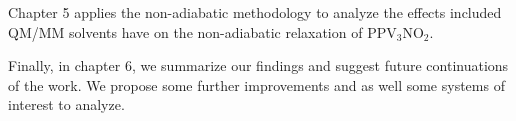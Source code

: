 Chapter 5 applies the non-adiabatic methodology to analyze the effects included QM/MM solvents have on the non-adiabatic relaxation of PPV\(_3\)NO\(_2\).

Finally, in chapter 6, we summarize our findings and suggest future continuations of the work.  We propose some further improvements and as well some systems of interest to analyze.
